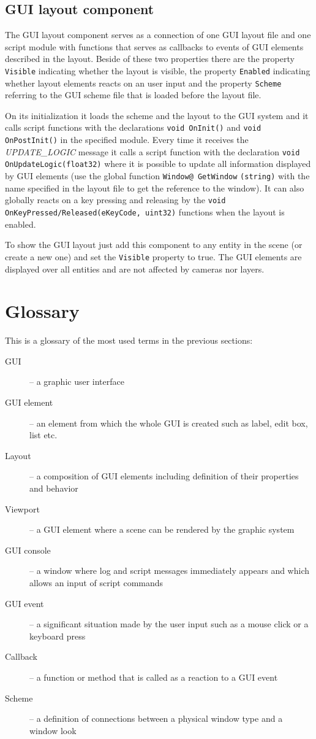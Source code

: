 \subsection{GUI layout component}

The GUI layout component serves as a connection of one GUI layout file and one script module with functions that serves as callbacks to events of GUI elements described in the layout. Beside of these two properties there are the property \verb/Visible/ indicating whether the layout is visible, the property \verb/Enabled/ indicating whether layout elements reacts on an user input and the property \verb/Scheme/ referring to the GUI scheme file that is loaded before the layout file.

On its initialization it loads the scheme and the layout to the GUI system and it calls script functions with the declarations \verb/void OnInit()/ and \verb/void OnPostInit()/ in the specified module. Every time it receives the \emph{UPDATE\_LOGIC} message it calls a script function with the declaration \verb/void OnUpdateLogic(float32)/ where it is possible to update all information displayed by GUI elements (use the global function \verb/Window@ GetWindow/ \verb/(string)/ with the name specified in the layout file to get the reference to the window). It can also globally reacts on a key pressing and releasing by the \verb$void OnKeyPressed/Released(eKeyCode, uint32)$ functions when the layout is enabled.

To show the GUI layout just add this component to any entity in the scene (or create a new one) and set the \verb/Visible/ property to true. The GUI elements are displayed over all entities and are not affected by cameras nor layers.

\section{Glossary}
This is a glossary of the most used terms in the previous sections:

\begin{description}
  \item[GUI] -- a graphic user interface
  \item[GUI element] -- an element from which the whole GUI is created such as label, edit box, list etc.
  \item[Layout] -- a composition of GUI elements including definition of their properties and behavior
  \item[Viewport] -- a GUI element where a scene can be rendered by the graphic system
  \item[GUI console] -- a window where log and script messages immediately appears and which allows an input of script commands
  \item[GUI event] -- a significant situation made by the user input such as a mouse click or a keyboard press
  \item[Callback] -- a function or method that is called as a reaction to a GUI event
  \item[Scheme] -- a definition of connections between a physical window type and a window look
\end{description}